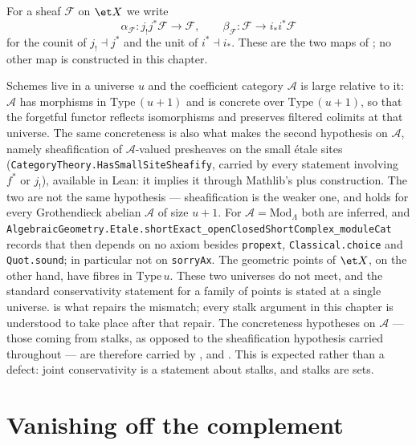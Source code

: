 For a sheaf $\mathcal F$ on $\et X$ we write
\[
  \alpha_{\mathcal F}\colon j_!j^*\mathcal F\to\mathcal F,
  \qquad
  \beta_{\mathcal F}\colon\mathcal F\to i_*i^*\mathcal F
\]
for the counit of $j_!\dashv j^*$ and the unit of $i^*\dashv i_*$.  These are
the two maps of ; no other map is constructed in
this chapter.

\begin{remark}[Universes]\label{rmk:openclosed-universes}
Schemes live in a universe $u$ and the coefficient category $\mathcal A$ is
large relative to it: $\mathcal A$ has morphisms in $\mathrm{Type}\,(u+1)$
and is concrete over $\mathrm{Type}\,(u+1)$, so that the forgetful functor
reflects isomorphisms and preserves filtered colimits at that universe.  The
same concreteness is also what makes the second hypothesis on $\mathcal A$,
namely sheafification of $\mathcal A$-valued presheaves on the small \'etale
sites (\texttt{CategoryTheory.HasSmallSiteSheafify}, carried by every statement
involving $f^*$ or $j_!$), available in Lean: it implies it through Mathlib's
plus construction.  The two are not the same hypothesis --- sheafification is
the weaker one, and holds for every Grothendieck abelian $\mathcal A$ of size
$u+1$.  For $\mathcal A=\mathrm{Mod}_\Lambda$ both are inferred, and
\texttt{AlgebraicGeometry.Etale.shortExact\_openClosedShortComplex\_moduleCat}
records that  then depends on no axiom besides
\texttt{propext}, \texttt{Classical.choice} and \texttt{Quot.sound}; in
particular not on \texttt{sorryAx}.  The geometric points of $\et X$, on the
other hand, have fibres in $\mathrm{Type}\,u$.  These two universes do not
meet, and the standard conservativity statement for a family of points is
stated at a single universe.
 is what repairs the mismatch; every
stalk argument in this chapter is understood to take place after that
repair.  The concreteness hypotheses on $\mathcal A$ --- those coming from
stalks, as opposed to the sheafification hypothesis carried throughout --- are
therefore carried by ,
 and .  This is
expected rather than a defect: joint conservativity is a statement about
stalks, and stalks are sets.
\end{remark}

\section{Vanishing off the complement}\label{sec:openclosed-vanishing}


